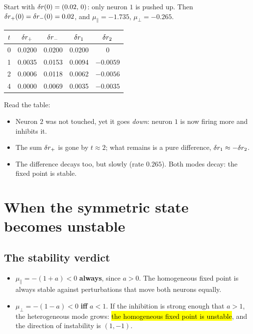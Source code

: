 \begin{example}[Kick one neuron: $\beta=1$, $\hext=1$, $J=3$, so $a=0.735$]
Start with $\delta r(0)=(0.02,\,0)$: only neuron $1$ is pushed up. Then $\delta r_+(0)=\delta r_-(0)=0.02$, and $\mu_\parallel=-1.735$, $\mu_\perp=-0.265$.
\begin{center}
\renewcommand{\arraystretch}{1.2}
\begin{tabular}{c|cc|cc}
$t$ & $\delta r_+$ & $\delta r_-$ & $\delta r_1$ & $\delta r_2$\\\hline
0 & 0.0200 & 0.0200 & 0.0200 & 0\\
1 & 0.0035 & 0.0153 & 0.0094 & $-0.0059$\\
2 & 0.0006 & 0.0118 & 0.0062 & $-0.0056$\\
4 & 0.0000 & 0.0069 & 0.0035 & $-0.0035$\\
\end{tabular}
\end{center}
Read the table:
\begin{itemize}
  \item Neuron $2$ was not touched, yet it goes \emph{down}: neuron $1$ is now firing more and inhibits it.
  \item The sum $\delta r_+$ is gone by $t\approx2$; what remains is a pure difference, $\delta r_1\approx-\delta r_2$.
  \item The difference decays too, but slowly (rate $0.265$). Both modes decay: the fixed point is stable.
\end{itemize}
\end{example}

\section{When the symmetric state becomes unstable}

\subsection{The stability verdict}

\begin{itemize}
  \item $\mu_\parallel=-(1+a)<0$ \textbf{always}, since $a>0$. The homogeneous fixed point is always stable against perturbations that move both neurons equally.
  \item $\mu_\perp=-(1-a)<0$ \textbf{iff} $a<1$. If the inhibition is strong enough that $a>1$, the heterogeneous mode grows: \hl{the homogeneous fixed point is unstable}, and the direction of instability is $(1,-1)$.
\end{itemize}

